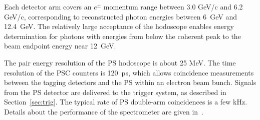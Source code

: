 Each detector arm covers an $e^\pm$ momentum range between 3.0 GeV/c
and 6.2 GeV/c,  corresponding to reconstructed photon energies between
6~GeV and 12.4~GeV. The relatively large acceptance of the hodoscope
enables energy determination for photons with energies from below the coherent peak
to the beam endpoint energy near 12~GeV.



The pair energy resolution of the PS hodoscope is about 25 MeV.
The time resolution of the PSC counters is 120~ps, which allows coincidence measurements between the tagging detectors and the PS within an electron beam bunch. Signals from the PS detector are delivered to the trigger system,
as described in Section~\ref{sec:trig}. The typical rate of PS double-arm coincidences
is a few kHz. Details about the performance of the spectrometer are given in~\cite{Somov:2017vhp,Somov:2016bgb}.



